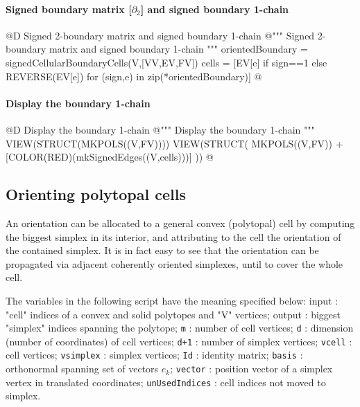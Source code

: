 \documentclass[11pt,oneside]{article}	%
\begin{document}
\paragraph{Signed boundary matrix [$\partial_2$] and signed boundary 1-chain}
@D Signed 2-boundary matrix and signed boundary 1-chain
@{""" Signed 2-boundary matrix  and signed boundary 1-chain """
orientedBoundary = signedCellularBoundaryCells(V,[VV,EV,FV])
cells = [EV[e] if sign==1 else REVERSE(EV[e]) for (sign,e) in zip(*orientedBoundary)]
@}

\paragraph{Display the boundary 1-chain}
@D Display the boundary 1-chain
@{""" Display the boundary 1-chain """
VIEW(STRUCT(MKPOLS((V,FV))))
VIEW(STRUCT(
	MKPOLS((V,FV)) +
	[COLOR(RED)(mkSignedEdges((V,cells)))]  ))
@}



\subsection{Orienting polytopal cells}

An orientation can be allocated to a general convex (polytopal) cell by computing the biggest simplex in its interior, and attributing to the cell the orientation of the contained simplex. 
It is in fact easy to see that the orientation can be propagated via adjacent coherently oriented simplexes, until to cover the whole cell.

The variables in the following script have the meaning specified below:
{input} :  "cell" indices of a convex and solid polytopes and "V" vertices;
{output} :  biggest "simplex" indices spanning the polytope;
{\tt m} : number of cell vertices;
{\tt d} : dimension (number of coordinates) of cell vertices;
{\tt d+1} : number of simplex vertices;
{\tt vcell} : cell vertices;
{\tt vsimplex} : simplex vertices;
{\tt Id} : identity matrix;
{\tt basis} : orthonormal spanning set of vectors $e_k$;
{\tt vector} : position vector of a simplex vertex in translated coordinates;
{\tt unUsedIndices} : cell indices not moved to simplex.
\end{document}
